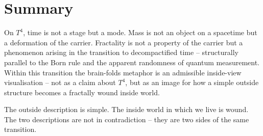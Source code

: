 \section{Summary}

On $T^4$, time is not a stage but a mode. Mass is not an object on
a spacetime but a deformation of the carrier. Fractality is not a
property of the carrier but a phenomenon arising in the transition
to decompactified time -- structurally parallel to the Born rule
and the apparent randomness of quantum measurement. Within this
transition the brain-folds metaphor is an admissible inside-view
visualisation -- not as a claim about $T^4$, but as an image for
how a simple outside structure becomes a fractally wound inside
world.

The outside description is simple. The inside world in which we
live is wound. The two descriptions are not in contradiction --
they are two sides of the same transition.

